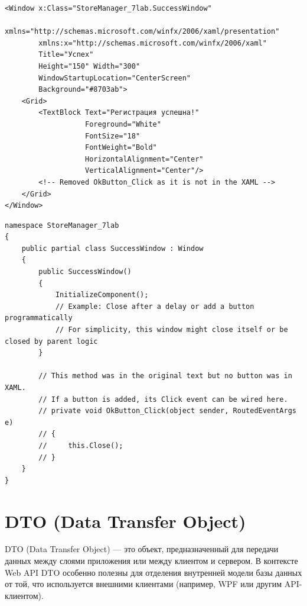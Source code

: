 \documentclass[12pt]{article}
\newcommand{\colorGIT}[1]{\textcolor{CtpLavender}{#1}}
\renewcommand{\texttt}[1]{{\small\ttfamily #1}}
\newenvironment{code}
  {\par\captionsetup{type=listing}\noindent}
  {\par\vspace{\baselineskip}}
\numberwithin{listing}{section}
\numberwithin{figure}{section}
\begin{document}
\begin{code}
	\begin{verbatim}
<Window x:Class="StoreManager_7lab.SuccessWindow"
        xmlns="http://schemas.microsoft.com/winfx/2006/xaml/presentation"
        xmlns:x="http://schemas.microsoft.com/winfx/2006/xaml"
        Title="Успех"
        Height="150" Width="300"
        WindowStartupLocation="CenterScreen"
        Background="#8703ab">
    <Grid>
        <TextBlock Text="Регистрация успешна!"
                   Foreground="White"
                   FontSize="18"
                   FontWeight="Bold"
                   HorizontalAlignment="Center"
                   VerticalAlignment="Center"/>
        <!-- Removed OkButton_Click as it is not in the XAML -->
    </Grid>
</Window>
\end{verbatim}
	\caption{Разметка окна успешной регистрации (\colorGIT{\href{https://github.com/WebMasterIT/Csharp_Labs/blob/main/7_lab_WPF/StoreManager_7lab/StoreManager_7lab/SuccessWindow.xaml}{\texttt{SuccessWindow.xaml}}})}
	\label{lst:success_window_markup}
\end{code}

\begin{code}
	\begin{verbatim}
namespace StoreManager_7lab
{
    public partial class SuccessWindow : Window
    {
        public SuccessWindow()
        {
            InitializeComponent();
            // Example: Close after a delay or add a button programmatically
            // For simplicity, this window might close itself or be closed by parent logic
        }

        // This method was in the original text but no button was in XAML.
        // If a button is added, its Click event can be wired here.
        // private void OkButton_Click(object sender, RoutedEventArgs e)
        // {
        //     this.Close();
        // }
    }
}
\end{verbatim}
	\caption{\colorGIT{\href{https://github.com/WebMasterIT/Csharp_Labs/blob/main/7_lab_WPF/StoreManager_7lab/StoreManager_7lab/SuccessWindow.xaml.cs}{\texttt{SuccessWindow.xaml.cs}}}}
\end{code}

\newpage

\section{DTO (Data Transfer Object)}
DTO (Data Transfer Object) — это объект, предназначенный для передачи данных между слоями приложения или между клиентом и сервером. В контексте Web API DTO особенно полезны для отделения внутренней модели базы данных от той, что используется внешними клиентами (например, WPF или другим API-клиентом).
\end{document}
